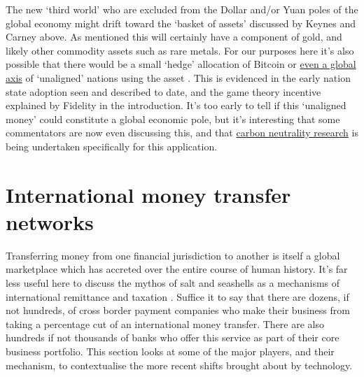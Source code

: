 The new `third world' who are excluded from the Dollar and/or Yuan poles of the global economy might drift toward the `basket of assets' discussed by Keynes and Carney above. As mentioned this will certainly have a component of gold, and likely other commodity assets such as rare metals. For our purposes here it's also possible that there would be a small `hedge' allocation of Bitcoin or \href{https://www.independent.co.uk/tech/bitcoin-el-salvador-crypto-btc-b2079881.html}{even a global axis} of `unaligned' nations using the asset \cite{hendrickson2021value}. This is evidenced in the early nation state adoption seen and described to date, and the game theory incentive explained by Fidelity in the introduction. It's too early to tell if this `unaligned money' could constitute a global economic pole, but it's interesting that some commentators are now even discussing this, and that \href{https://docs.google.com/document/d/1Ynl5bbdTqev-wbTAWQoeWdh1cJVf3ortuSjre9K9wGQ/edit}{carbon neutrality research} is being undertaken specifically for this application.

\section{International money transfer networks}
Transferring money from one financial jurisdiction to another is itself a global marketplace which has accreted over the entire course of human history. It's far less useful here to discuss the mythos of salt and seashells as a mechanisms of international remittance and taxation \cite{gainsford2017salt, goldberg2005famous}. Suffice it to say that there are dozens, if not hundreds, of cross border payment companies who make their business from taking a percentage cut of an international money transfer. There are also hundreds if not thousands of banks who offer this service as part of their core business portfolio. This section looks at some of the major players, and their mechanism, to contextualise the more recent shifts brought about by technology.
